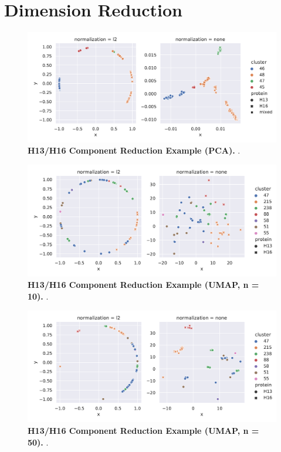 \section{Dimension Reduction} \label{sec:Dimension_Reduction}

\blindtext

\begin{figure}[!hbt]
    \centering
    \includegraphics[width=\textwidth]{PCA/Difference_Segment_4_H_PCA.pdf}
    \caption[H13/H16 Component Reduction Example (\Acrshort{PCA})]{\textbf{H13/H16 Component Reduction Example (\Acrshort{PCA}).} .}
    \label{fig:Reduction_Example_PCA}
\end{figure}

\begin{figure}[!hbt]
    \centering
    \includegraphics[width=\textwidth]{UMAP/Difference_Segment_4_H_UMAP_Neighbors_10.pdf}
    \caption[H13/H16 Component Reduction Example (\Acrshort{UMAP}, n = 10)]{\textbf{H13/H16 Component Reduction Example (\Acrshort{UMAP}, n = 10).} .}
    \label{fig:Reduction_Example_UMAP_10}
\end{figure}

\begin{figure}[!hbt]
    \centering
    \includegraphics[width=\textwidth]{UMAP/Difference_Segment_4_H_UMAP_Neighbors_50.pdf}
    \caption[H13/H16 Component Reduction Example (\Acrshort{UMAP}, n = 50)]{\textbf{H13/H16 Component Reduction Example (\Acrshort{UMAP}, n = 50).} .}
    \label{fig:Reduction_Example_UMAP_50}
\end{figure}

